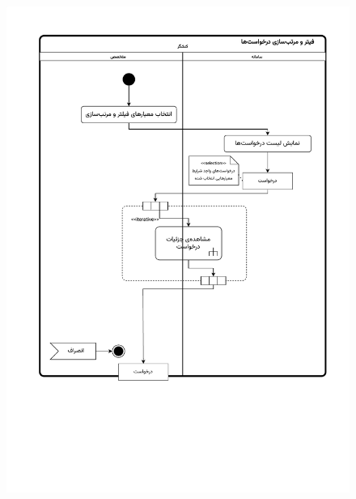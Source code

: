 \begin{figure}[ht!]
	\centering
	\includegraphics[scale=0.6, page=1]{figs/OOD-activity-filterreq.pdf}
\end{figure}
\FloatBarrier
\newpage

